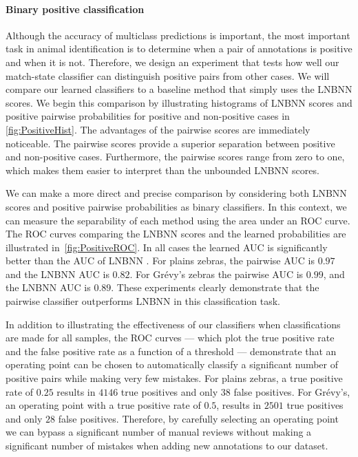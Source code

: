         \ReRank{}
        
        \FloatBarrier{}
        \paragraph{Binary positive classification}
        Although the accuracy of multiclass predictions is important, the most important task in animal
          identification is to determine when a pair of annotations is positive and when it is not.
        Therefore, we design an experiment that tests how well our match-state classifier can distinguish
          positive pairs from other cases.
        We will compare our learned classifiers to a baseline method that simply uses the LNBNN scores.
        We begin this comparison by illustrating histograms of LNBNN scores and positive pairwise probabilities
          for positive and non-positive cases in \cref{fig:PositiveHist}.
        The advantages of the pairwise scores are immediately noticeable.
        The pairwise scores provide a superior separation between positive and non-positive cases.
        Furthermore, the pairwise scores range from zero to one, which makes them easier to interpret than the
          unbounded LNBNN scores.

        We can make a more direct and precise comparison by considering both LNBNN scores and positive pairwise
          probabilities as binary classifiers.
        In this context, we can measure the separability of each method using the area under an ROC curve.
        The ROC curves comparing the LNBNN scores and the learned probabilities are illustrated
          in~\cref{fig:PositiveROC}.
        In all cases the learned AUC is significantly better than the AUC of LNBNN .
        For plains zebras, the pairwise AUC is $0.97$ and the LNBNN AUC is $0.82$.
        For Grévy's zebras the pairwise AUC is $0.99$, and the LNBNN AUC is $0.89$.
        These experiments clearly demonstrate that the pairwise classifier outperforms LNBNN in this
          classification task.

        In addition to illustrating the effectiveness of our classifiers when classifications are made for all
          samples, the ROC curves --- which plot the true positive rate and the false positive rate as a function
          of a threshold --- demonstrate that an operating point can be chosen to automatically classify a
          significant number of positive pairs while making very few mistakes.
        For plains zebras, a true positive rate of $0.25$ results in $4146$ true positives and only $38$ false
          positives.
        For Grévy's, an operating point with a true positive rate of $0.5$, results in $2501$ true positives and
          only $28$ false positives.
        Therefore, by carefully selecting an operating point we can bypass a significant number of manual reviews
          without making a significant number of mistakes when adding new annotations to our dataset.


